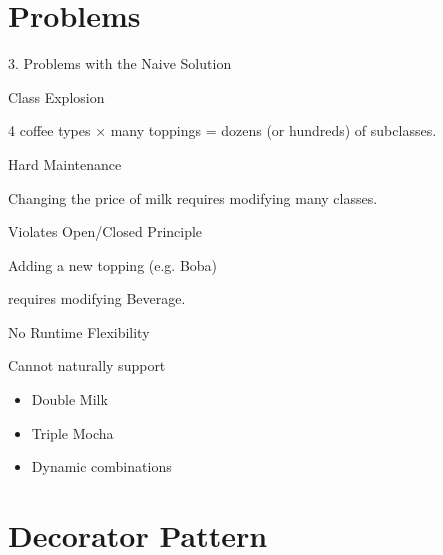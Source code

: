 \documentclass[aspectratio=169]{beamer}
\begin{document}

\section{Problems}

\begin{frame}{3. Problems with the Naive Solution}

\begin{block}{Class Explosion}

4 coffee types × many toppings = dozens (or hundreds) of subclasses.

\end{block}

\pause

\begin{block}{Hard Maintenance}

Changing the price of milk requires modifying many classes.

\end{block}

\pause

\begin{block}{Violates Open/Closed Principle}

Adding a new topping (e.g. Boba)

requires modifying Beverage.

\end{block}

\pause

\begin{block}{No Runtime Flexibility}

Cannot naturally support

\begin{itemize}
\item Double Milk
\item Triple Mocha
\item Dynamic combinations
\end{itemize}

\end{block}

\end{frame}


\section{Decorator Pattern}
\end{document}
